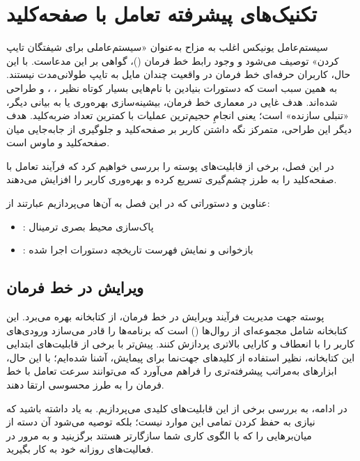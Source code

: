 \chapter{تکنیک‌های پیشرفته تعامل با صفحه‌کلید}

سیستم‌عامل یونیکس اغلب به مزاح به‌عنوان «سیستم‌عاملی برای شیفتگان تایپ کردن» توصیف می‌شود و وجود رابط خط فرمان ()، گواهی بر این مدعاست. با این حال، کاربران حرفه‌ای خط فرمان در واقعیت چندان مایل به تایپ طولانی‌مدت نیستند. به همین سبب است که دستورات بنیادین با نام‌هایی بسیار کوتاه نظیر ، ،  و  طراحی شده‌اند. هدف غایی در معماری خط فرمان، بیشینه‌سازی بهره‌وری یا به بیانی دیگر، «تنبلی سازنده» است؛ یعنی انجامِ حجیم‌ترین عملیات با کمترین تعداد ضربه‌کلید. هدف دیگر این طراحی، متمرکز نگه داشتن کاربر بر صفحه‌کلید و جلوگیری از جابه‌جایی میان صفحه‌کلید و ماوس است.

در این فصل، برخی از قابلیت‌های پوسته  را بررسی خواهیم کرد که فرآیند تعامل با صفحه‌کلید را به طرز چشم‌گیری تسریع کرده و بهره‌وری کاربر را افزایش می‌دهند.

عناوین و دستوراتی که در این فصل به آن‌ها می‌پردازیم عبارتند از:

\begin{itemize}
  \item {}: پاک‌سازی محیط بصری ترمینال
  \item {}: بازخوانی و نمایش فهرست تاریخچه دستورات اجرا شده
\end{itemize}

\section{ویرایش در خط فرمان}

پوسته  جهت مدیریت فرآیند ویرایش در خط فرمان، از کتابخانه  بهره می‌برد. این کتابخانه شامل مجموعه‌ای از روال‌ها () است که برنامه‌ها را قادر می‌سازد ورودی‌های کاربر را با انعطاف و کارایی بالاتری پردازش کنند. پیش‌تر با برخی از قابلیت‌های ابتدایی این کتابخانه، نظیر استفاده از کلیدهای جهت‌نما برای پیمایش، آشنا شده‌ایم؛ با این حال،  ابزارهای به‌مراتب پیشرفته‌تری را فراهم می‌آورد که می‌توانند سرعت تعامل با خط فرمان را به طرز محسوسی ارتقا دهند.

در ادامه، به بررسی برخی از این قابلیت‌های کلیدی می‌پردازیم. به یاد داشته باشید که نیازی به حفظ کردن تمامی این موارد نیست؛ بلکه توصیه می‌شود آن دسته از میان‌برهایی را که با الگوی کاری شما سازگارتر هستند برگزینید و به مرور در فعالیت‌های روزانه خود به کار بگیرید.

